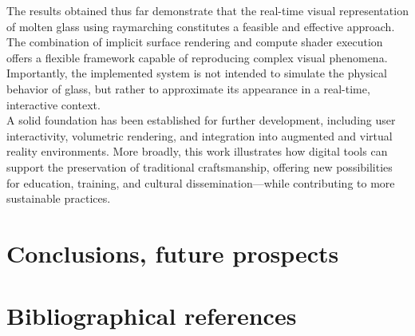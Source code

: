 \documentclass{rapportcs}
\begin{document}
        The results obtained thus far demonstrate that the real-time visual representation of molten glass using raymarching constitutes a feasible and effective approach. The combination of implicit surface rendering and compute shader execution offers a flexible framework capable of reproducing complex visual phenomena. Importantly, the implemented system is not intended to simulate the physical behavior of glass, but rather to approximate its appearance in a real-time, interactive context. \\
        
        A solid foundation has been established for further development, including user interactivity, volumetric rendering, and integration into augmented and virtual reality environments. More broadly, this work illustrates how digital tools can support the preservation of traditional craftsmanship, offering new possibilities for education, training, and cultural dissemination—while contributing to more sustainable practices.

\newpage

\section{Conclusions, future prospects}

\newpage
    
\section{Bibliographical references}
    \nocite{*}
    \begingroup
        \renewcommand{\refname}{}%
        \vspace*{-2em} %
    \endgroup
\end{document}
